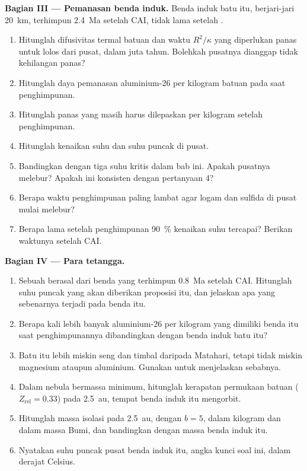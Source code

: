 \begin{problem}
\noindent\textbf{Bagian III --- Pemanasan benda induk.}
Benda induk batu itu, berjari-jari \qty{20}{km}, terhimpun \qty{2.4}{Ma} setelah
CAI, tidak lama setelah .
\begin{enumerate}[resume]
  \item Hitunglah difusivitas termal batuan dan waktu $R^2/\kappa$ yang diperlukan
        panas untuk lolos dari pusat, dalam juta tahun. Bolehkah pusatnya
        dianggap tidak kehilangan panas?
  \item Hitunglah daya pemanasan aluminium-26 per kilogram batuan pada saat
        penghimpunan.
  \item Hitunglah panas yang masih harus dilepaskan per kilogram setelah penghimpunan.
  \item Hitunglah kenaikan suhu dan suhu puncak di pusat.
  \item Bandingkan dengan tiga suhu kritis dalam bab ini. Apakah pusatnya
        melebur? Apakah ini konsisten dengan pertanyaan 4?
  \item Berapa waktu penghimpunan paling lambat agar logam dan sulfida di
        pusat mulai melebur?
  \item Berapa lama setelah penghimpunan \qty{90}{\percent} kenaikan suhu
        tercapai? Berikan waktunya setelah CAI.
\end{enumerate}

\noindent\textbf{Bagian IV --- Para tetangga.}
\begin{enumerate}[resume]
  \item Sebuah  berasal dari benda yang terhimpun \qty{0.8}{Ma} setelah
        CAI. Hitunglah suhu puncak yang akan diberikan proposisi itu, dan jelaskan
        apa yang sebenarnya terjadi pada benda itu.
  \item Berapa kali lebih banyak aluminium-26 per kilogram yang dimiliki benda itu saat
        penghimpunannya dibandingkan dengan benda induk batu itu?
  \item Batu itu lebih miskin seng dan timbal daripada Matahari, tetapi tidak miskin magnesium ataupun
        aluminium. Gunakan  untuk menjelaskan sebabnya.
  \item Dalam nebula bermassa minimum, hitunglah kerapatan permukaan batuan
        ($Z_{\mathrm{rel}} = 0.33$) pada \qty{2.5}{au}, tempat benda induk itu
        mengorbit.
  \item Hitunglah massa isolasi pada \qty{2.5}{au}, dengan $b = 5$, dalam kilogram dan
        dalam massa Bumi, dan bandingkan dengan massa benda induk itu.
  \item Nyatakan suhu puncak pusat benda induk itu, angka kunci
        soal ini, dalam derajat Celsius.
\end{enumerate}
\end{problem}
